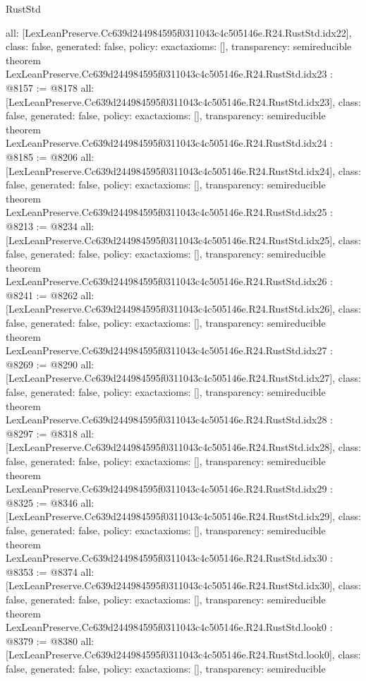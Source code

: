 \begin{lexlean}{RustStd}
\begin{coremodule}
{  all: [LexLeanPreserve.Cc639d244984595f0311043c4c505146e.R24.RustStd.idx22],
  class: false,
  generated: false,
  policy: exact{axioms: []},
  transparency: semireducible
}
theorem LexLeanPreserve.Cc639d244984595f0311043c4c505146e.R24.RustStd.idx23 : @8157 := @8178 {
  all: [LexLeanPreserve.Cc639d244984595f0311043c4c505146e.R24.RustStd.idx23],
  class: false,
  generated: false,
  policy: exact{axioms: []},
  transparency: semireducible
}
theorem LexLeanPreserve.Cc639d244984595f0311043c4c505146e.R24.RustStd.idx24 : @8185 := @8206 {
  all: [LexLeanPreserve.Cc639d244984595f0311043c4c505146e.R24.RustStd.idx24],
  class: false,
  generated: false,
  policy: exact{axioms: []},
  transparency: semireducible
}
theorem LexLeanPreserve.Cc639d244984595f0311043c4c505146e.R24.RustStd.idx25 : @8213 := @8234 {
  all: [LexLeanPreserve.Cc639d244984595f0311043c4c505146e.R24.RustStd.idx25],
  class: false,
  generated: false,
  policy: exact{axioms: []},
  transparency: semireducible
}
theorem LexLeanPreserve.Cc639d244984595f0311043c4c505146e.R24.RustStd.idx26 : @8241 := @8262 {
  all: [LexLeanPreserve.Cc639d244984595f0311043c4c505146e.R24.RustStd.idx26],
  class: false,
  generated: false,
  policy: exact{axioms: []},
  transparency: semireducible
}
theorem LexLeanPreserve.Cc639d244984595f0311043c4c505146e.R24.RustStd.idx27 : @8269 := @8290 {
  all: [LexLeanPreserve.Cc639d244984595f0311043c4c505146e.R24.RustStd.idx27],
  class: false,
  generated: false,
  policy: exact{axioms: []},
  transparency: semireducible
}
theorem LexLeanPreserve.Cc639d244984595f0311043c4c505146e.R24.RustStd.idx28 : @8297 := @8318 {
  all: [LexLeanPreserve.Cc639d244984595f0311043c4c505146e.R24.RustStd.idx28],
  class: false,
  generated: false,
  policy: exact{axioms: []},
  transparency: semireducible
}
theorem LexLeanPreserve.Cc639d244984595f0311043c4c505146e.R24.RustStd.idx29 : @8325 := @8346 {
  all: [LexLeanPreserve.Cc639d244984595f0311043c4c505146e.R24.RustStd.idx29],
  class: false,
  generated: false,
  policy: exact{axioms: []},
  transparency: semireducible
}
theorem LexLeanPreserve.Cc639d244984595f0311043c4c505146e.R24.RustStd.idx30 : @8353 := @8374 {
  all: [LexLeanPreserve.Cc639d244984595f0311043c4c505146e.R24.RustStd.idx30],
  class: false,
  generated: false,
  policy: exact{axioms: []},
  transparency: semireducible
}
theorem LexLeanPreserve.Cc639d244984595f0311043c4c505146e.R24.RustStd.look0 : @8379 := @8380 {
  all: [LexLeanPreserve.Cc639d244984595f0311043c4c505146e.R24.RustStd.look0],
  class: false,
  generated: false,
  policy: exact{axioms: []},
  transparency: semireducible
}
\end{coremodule}
\end{lexlean}
